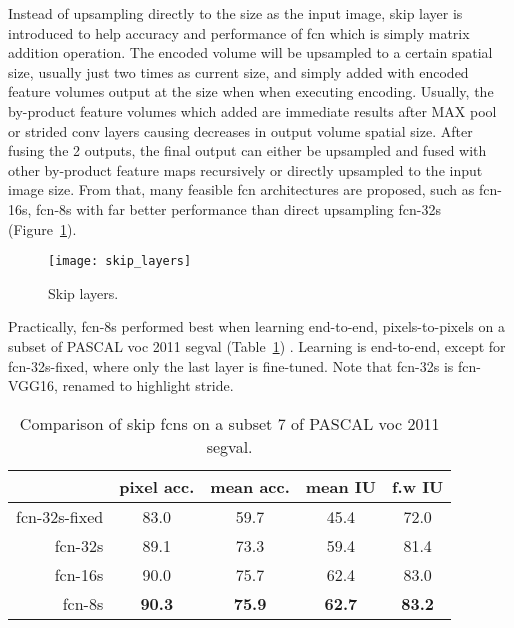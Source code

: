 Instead of upsampling directly to the size as the input image, skip layer is
introduced to help accuracy and performance of \acrshort{fcn} which is simply
matrix addition operation. The encoded volume will be upsampled to a certain
spatial size, usually just two times as current size, and simply added with
encoded feature volumes output at the size when when executing encoding.
Usually, the by-product feature volumes which added are immediate results after
MAX \acrshort{pool} or strided \acrshort{conv} layers causing decreases in
output volume spatial size. After fusing the 2 outputs, the final output can
either be upsampled and fused with other by-product feature maps recursively or
directly upsampled to the input image size. From that, many feasible
\acrshort{fcn} architectures are proposed, such as \acrshort{fcn}-16s,
\acrshort{fcn}-8s with far better performance than direct upsampling
\acrshort{fcn}-32s (Figure~\ref{fig:fcn-32-16-8s}).
\begin{figure}[h]
    \centering
    \texttt{[image: skip\_layers]}
    \caption{Skip layers.}
    \label{fig:fcn-32-16-8s}
\end{figure}

Practically, \acrshort{fcn}-8s performed best when learning end-to-end,
pixels-to-pixels on a subset of PASCAL \acrfull{voc} 2011 \cite{pascal-voc-2011}
segval (Table~\ref{tab:fcn_comparison}) \cite{Long_2015_CVPR}. Learning is
end-to-end, except for \acrshort{fcn}-32s-fixed, where only the last layer is
fine-tuned. Note that \acrshort{fcn}-32s is \acrshort{fcn}-VGG16, renamed to
highlight stride.
\begin{table}[h]
    \centering
    \begin{tabular}{ r | c c c c }
        & pixel acc. & mean acc. & mean IU & f.w IU \\
        \hline
        \acrshort{fcn}-32s-fixed & 83.0 & 59.7 & 45.4 & 72.0 \\
        \acrshort{fcn}-32s & 89.1 & 73.3 & 59.4 & 81.4 \\
        \acrshort{fcn}-16s & 90.0 & 75.7 & 62.4 & 83.0 \\
        \acrshort{fcn}-8s & \textbf{90.3} & \textbf{75.9} & \textbf{62.7} &
        \textbf{83.2}
    \end{tabular}
    \caption{Comparison of skip \acrshort{fcn}s on a subset 7 of
    PASCAL \acrshort{voc} 2011 segval.}
    \label{tab:fcn_comparison}
\end{table}
